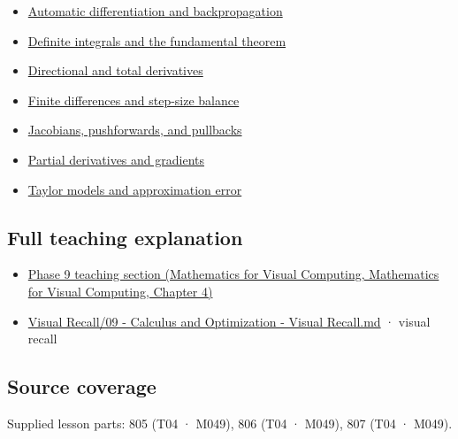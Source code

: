 \begin{itemize}
\tightlist
\item
  \hyperref[appendix-40df0855b4a7]{Automatic differentiation and backpropagation}
\item
  \hyperref[appendix-1a50e72435c2]{Definite integrals and the fundamental theorem}
\item
  \hyperref[appendix-e2d476574aab]{Directional and total derivatives}
\item
  \hyperref[appendix-e2d7b4f2161d]{Finite differences and step-size balance}
\item
  \hyperref[appendix-d8a7ddb675eb]{Jacobians, pushforwards, and pullbacks}
\item
  \hyperref[appendix-677b59746ae0]{Partial derivatives and gradients}
\item
  \hyperref[appendix-32f39e9a3738]{Taylor models and approximation error}
\end{itemize}

\subsection{Full teaching explanation}\label{appendix-7bc181935c42-full-teaching-explanation}

\begin{itemize}
\tightlist
\item
  \href{../02-Mathematics-for-Visual-Computing/main.pdf\#nameddest=01-foundations-i-ch020-functions-limits-continuity-and-scalar-change}{Phase 9 teaching section (Mathematics for Visual Computing, Mathematics for Visual Computing, Chapter 4)}
\item
  \hyperref[appendix-adf48f5dc5c1]{Visual Recall/09 - Calculus and Optimization - Visual Recall.md} · visual recall
\end{itemize}

\subsection{Source coverage}\label{appendix-7bc181935c42-source-coverage}

Supplied lesson parts: 805 (T04 · M049), 806 (T04 · M049), 807 (T04 · M049).
